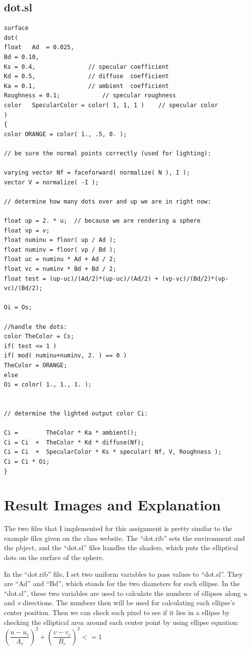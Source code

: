 \documentclass[letterpaper,14pt,titlepage,fleqn]{article}
\begin{document}
\subsection{dot.sl}
\begin{lstlisting}
surface
dot(
float	Ad  = 0.025,
Bd = 0.10,
Ks = 0.4,				// specular coefficient
Kd = 0.5, 				// diffuse  coefficient
Ka = 0.1, 				// ambient  coefficient
Roughness = 0.1;			// specular roughness
color	SpecularColor = color( 1, 1, 1 )	// specular color
)
{
color ORANGE = color( 1., .5, 0. );

// be sure the normal points correctly (used for lighting):

varying vector Nf = faceforward( normalize( N ), I );
vector V = normalize( -I );

// determine how many dots over and up we are in right now:

float up = 2. * u;	// because we are rendering a sphere
float vp = v;
float numinu = floor( up / Ad );
float numinv = floor( vp / Bd );
float uc = numinu * Ad + Ad / 2;
float vc = numinv * Bd + Bd / 2;
float test = (up-uc)/(Ad/2)*(up-uc)/(Ad/2) + (vp-vc)/(Bd/2)*(vp-vc)/(Bd/2);

Oi = Os;

//handle the dots:
color TheColor = Cs;
if( test <= 1 )
if( mod( numinu+numinv, 2. ) == 0 )
TheColor = ORANGE;
else
Oi = color( 1., 1., 1. );


// determine the lighted output color Ci:

Ci =        TheColor * Ka * ambient();
Ci = Ci  +  TheColor * Kd * diffuse(Nf);
Ci = Ci  +  SpecularColor * Ks * specular( Nf, V, Roughness );
Ci = Ci * Oi;
}
\end{lstlisting}

\section{Result Images and Explanation}
The two files that I implemented for this assignment is pretty similar to the example files given on the class website. The ``dot.rib'' sets the environment and the pbject, and the ``dot.sl'' files handles the shaders, which puts the elliptical dots on the surface of the sphere.

In the ``dot.rib'' file, I set two uniform variables to pass values to ``dot.sl''. They are ``Ad'' and ``Bd'', which stands for the two diameters for each ellipse. In the ``dot.sl'', these two variables are used to calculate the numbers of ellipses along \textit{u} and \textit{v} directions. The numbers then will be used for calculating each ellipse's center position. Then we can check each pixel to see if it lies in a ellipse by checking the elliptical area around each center point by using ellipse equation: $(\dfrac{u-u_c}{A_r})^2+(\dfrac{v-v_c}{B_r})^2<=1$
\end{document}
